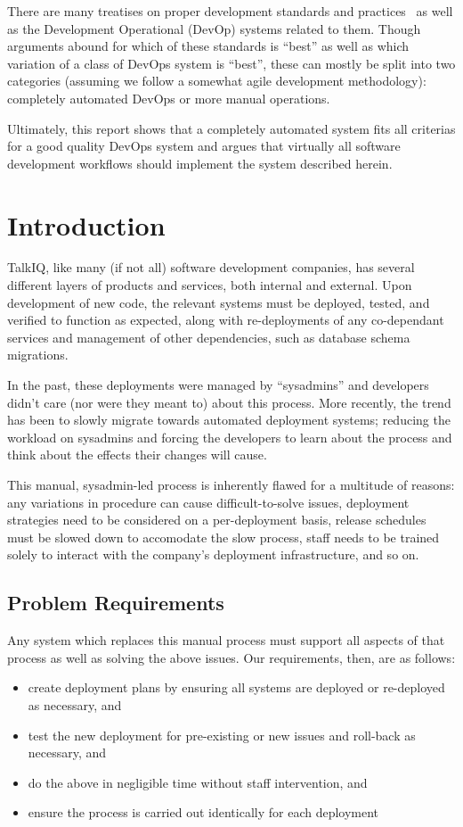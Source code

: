 \documentclass[12pt]{article}
\begin{document}
There are many treatises on proper development standards and practices~\cite{practices} as well as the Development Operational (DevOp) systems related to them. Though arguments abound for which of these standards is ``best'' as well as which variation of a class of DevOps system is ``best'', these can mostly be split into two categories (assuming we follow a somewhat agile development methodology): completely automated DevOps or more manual operations.

Ultimately, this report shows that a completely automated system fits all criterias for a good quality DevOps system and argues that virtually all software development workflows should implement the system described herein.
\newpage


\toc
\lot


\section{Introduction}
TalkIQ, like many (if not all) software development companies, has several different layers of products and services, both internal and external. Upon development of new code, the relevant systems must be deployed, tested, and verified to function as expected, along with re-deployments of any co-dependant services and management of other dependencies, such as database schema migrations.

In the past, these deployments were managed by ``sysadmins'' and developers didn't care (nor were they meant to) about this process. More recently, the trend has been to slowly migrate towards automated deployment systems; reducing the workload on sysadmins and forcing the developers to learn about the process and think about the effects their changes will cause.

This manual, sysadmin-led process is inherently flawed for a multitude of reasons: any variations in procedure can cause difficult-to-solve issues, deployment strategies need to be considered on a per-deployment basis, release schedules must be slowed down to accomodate the slow process, staff needs to be trained solely to interact with the company's deployment infrastructure, and so on.

\subsection{Problem Requirements}
Any system which replaces this manual process must support all aspects of that process as well as solving the above issues. Our requirements, then, are as follows:
\begin{itemize}
\item create deployment plans by ensuring all systems are deployed or re-deployed as necessary, and
\item test the new deployment for pre-existing or new issues and roll-back as necessary, and
\item do the above in negligible time without staff intervention, and
\item ensure the process is carried out identically for each deployment
\end{itemize}
\end{document}
